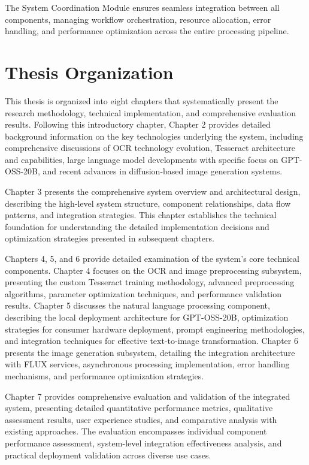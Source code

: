 The System Coordination Module ensures seamless integration between all components, managing workflow orchestration, resource allocation, error handling, and performance optimization across the entire processing pipeline.

\section{Thesis Organization}

This thesis is organized into eight chapters that systematically present the research methodology, technical implementation, and comprehensive evaluation results. Following this introductory chapter, Chapter 2 provides detailed background information on the key technologies underlying the system, including comprehensive discussions of OCR technology evolution, Tesseract architecture and capabilities, large language model developments with specific focus on GPT-OSS-20B, and recent advances in diffusion-based image generation systems.

Chapter 3 presents the comprehensive system overview and architectural design, describing the high-level system structure, component relationships, data flow patterns, and integration strategies. This chapter establishes the technical foundation for understanding the detailed implementation decisions and optimization strategies presented in subsequent chapters.

Chapters 4, 5, and 6 provide detailed examination of the system's core technical components. Chapter 4 focuses on the OCR and image preprocessing subsystem, presenting the custom Tesseract training methodology, advanced preprocessing algorithms, parameter optimization techniques, and performance validation results. Chapter 5 discusses the natural language processing component, describing the local deployment architecture for GPT-OSS-20B, optimization strategies for consumer hardware deployment, prompt engineering methodologies, and integration techniques for effective text-to-image transformation. Chapter 6 presents the image generation subsystem, detailing the integration architecture with FLUX services, asynchronous processing implementation, error handling mechanisms, and performance optimization strategies.

Chapter 7 provides comprehensive evaluation and validation of the integrated system, presenting detailed quantitative performance metrics, qualitative assessment results, user experience studies, and comparative analysis with existing approaches. The evaluation encompasses individual component performance assessment, system-level integration effectiveness analysis, and practical deployment validation across diverse use cases.

